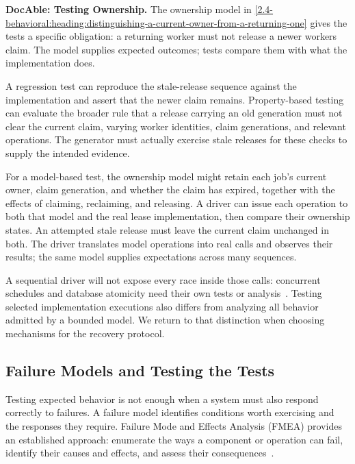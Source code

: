 \textbf{DocAble: Testing Ownership.} The ownership model in \autoref{2.4-behavioral:heading:distinguishing-a-current-owner-from-a-returning-one} gives the tests a specific obligation: a returning worker must not release a newer worker\textquotesingle s claim. The model supplies expected outcomes; tests compare them with what the implementation does.

A regression test can reproduce the stale-release sequence against the implementation and assert that the newer claim remains. Property-based testing can evaluate the broader rule that a release carrying an old generation must not clear the current claim, varying worker identities, claim generations, and relevant operations. The generator must actually exercise stale releases for these checks to supply the intended evidence.

For a model-based test, the ownership model might retain each job's current owner, claim generation, and whether the claim has expired, together with the effects of claiming, reclaiming, and releasing. A driver can issue each operation to both that model and the real lease implementation, then compare their ownership states. An attempted stale release must leave the current claim unchanged in both. The driver translates model operations into real calls and observes their results; the same model supplies expectations across many sequences.

A sequential driver will not expose every race inside those calls: concurrent schedules and database atomicity need their own tests or analysis~\citep{prenninger2005abstractions}. Testing selected implementation executions also differs from analyzing all behavior admitted by a bounded model. We return to that distinction when choosing mechanisms for the recovery protocol.

\subsection{Failure Models and Testing the Tests}\label{heading:model-and-exercise-failure-responses}

Testing expected behavior is not enough when a system must also respond correctly to failures. A failure model identifies conditions worth exercising and the responses they require. Failure Mode and Effects Analysis (FMEA) provides an established approach: enumerate the ways a component or operation can fail, identify their causes and effects, and assess their consequences~\citep{iec60812_2018}.

